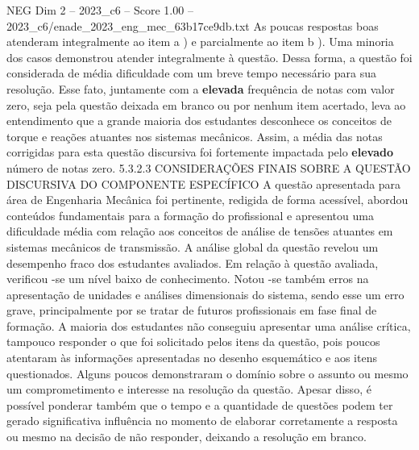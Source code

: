 \begin{textsample}{NEG Dim 2 – 2023\_c6 – Score 1.00 – 2023\_c6/enade\_2023\_eng\_mec\_63b17ce9db.txt}
As poucas respostas boas atenderam integralmente ao item a ) e parcialmente ao item b ).
Uma minoria dos casos demonstrou atender integralmente à questão.
Dessa forma, a questão foi considerada de média dificuldade com um breve tempo necessário para sua resolução.
Esse fato, juntamente com a \textbf{elevada} frequência de notas com valor zero, seja pela questão deixada em branco ou por nenhum item acertado, leva ao entendimento que a grande maioria dos estudantes desconhece os conceitos de torque e reações atuantes nos sistemas mecânicos.
Assim, a média das notas corrigidas para esta questão discursiva foi fortemente impactada pelo \textbf{elevado} número de notas zero. 5.3.2.3 CONSIDERAÇÕES FINAIS SOBRE A QUESTÃO DISCURSIVA DO COMPONENTE ESPECÍFICO A questão apresentada para área de Engenharia Mecânica foi pertinente, redigida de forma acessível, abordou conteúdos fundamentais para a formação do profissional e apresentou uma dificuldade média com relação aos conceitos de análise de tensões atuantes em sistemas mecânicos de transmissão.
A análise global da questão revelou um desempenho fraco dos estudantes avaliados.
Em relação à questão avaliada, verificou -se um nível baixo de conhecimento.
Notou -se também erros na apresentação de unidades e análises dimensionais do sistema, sendo esse um erro grave, principalmente por se tratar de futuros profissionais em fase final de formação.
A maioria dos estudantes não conseguiu apresentar uma análise crítica, tampouco responder o que foi solicitado pelos itens da questão, pois poucos atentaram às informações apresentadas no desenho esquemático e aos itens questionados.
Alguns poucos demonstraram o domínio sobre o assunto ou mesmo um comprometimento e interesse na resolução da questão.
Apesar disso, é possível ponderar também que o tempo e a quantidade de questões podem ter gerado significativa influência no momento de elaborar corretamente a resposta ou mesmo na decisão de não responder, deixando a resolução em branco.

\end{textsample}
